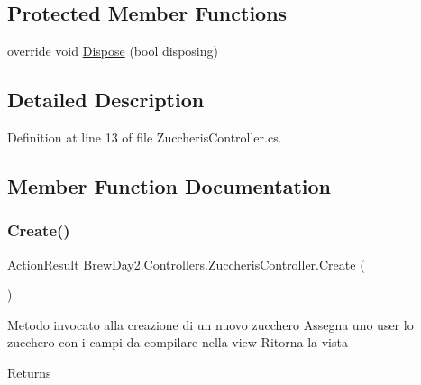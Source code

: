 \subsection*{Protected Member Functions}
\begin{DoxyCompactItemize}
\item 
override void \mbox{\hyperlink{class_brew_day2_1_1_controllers_1_1_zuccheris_controller_acd38549fec2cb20af4b6a41c94ba6b0a}{Dispose}} (bool disposing)
\end{DoxyCompactItemize}


\subsection{Detailed Description}


Definition at line 13 of file Zuccheris\+Controller.\+cs.



\subsection{Member Function Documentation}
\mbox{\label{class_brew_day2_1_1_controllers_1_1_zuccheris_controller_a47bd1b297f1aedb0d7e3b3a374b2ea33}} 
\subsubsection{\texorpdfstring{Create()}{Create()}\hspace{0.1cm}{\footnotesize\ttfamily [1/2]}}
{\footnotesize\ttfamily Action\+Result Brew\+Day2.\+Controllers.\+Zuccheris\+Controller.\+Create (\begin{DoxyParamCaption}{ }\end{DoxyParamCaption})}



Metodo invocato alla creazione di un nuovo zucchero Assegna uno user lo zucchero con i campi da compilare nella view Ritorna la vista 

\begin{DoxyReturn}{Returns}

\end{DoxyReturn}


